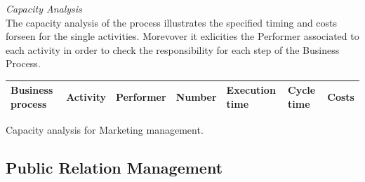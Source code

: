 \noindent
\emph{Capacity Analysis}\\
The capacity analysis of the process illustrates the specified timing and costs forseen for the single activities. Morevover it exlicities the Performer associated to each activity in order to check the responsibility for each step of the Business Process.

\begin{landscape}
\centering
{\tiny
\begin{tabular}{|l|l|l|l|l|l|l|}
Business process&Activity&Performer&Number&Execution time&Cycle time&Costs\\
\hline

\end{tabular}
}
\caption{Capacity analysis for Marketing management.}
\end{landscape}
%

%

\subsection{Public Relation Management}
